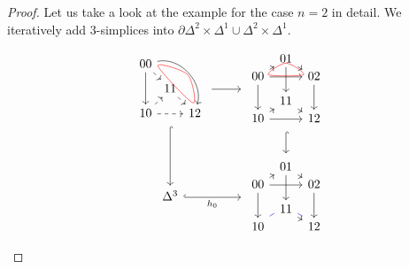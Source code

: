 \begin{proof}
        
    Let us take a look at the example for the case $n=2$ in detail.
    We iteratively add 3-simplices into $\partial \Delta^2 \times \Delta^1 \cup \Delta^2 \times \Delta^1$.
    \[
    \begin{tikzcd}
        \begin{tikzpicture}
            \node (A) at (-0.7,0.7) {$00$};
            \node (B) at (-0.7,-0.7) {$10$};
            \node (C) at (0.7,-0.7) {$12$};
            \node (D) at (0,0) {$11$};
            \draw [-> ] (A) -- (B);
            \draw[->] (A) to [bend left=60] (C);
            \draw [->, dashed] (A) -- (D);
            \draw [->, dashed] (B) -- (C);
            \draw [->, dashed] (B) -- (D);
            \draw [->, dashed] (D) -- (C);
            \draw [red] [smooth cycle] plot coordinates { (-0.35,0.75) (0.65,-0.3) (0.5,0.5)};
        \end{tikzpicture}
    \ar[r]
    \ar[d, hook]
    &
        \begin{tikzpicture}
            \node (A) at (0, 0.85) {$01$};
            \node (B) at (-0.8, 0.35) {$00$};
            \node (C) at (0.8, 0.35) {$02$};
            \node (D) at (0, -0.35) {$11$};
            \node (E) at (-0.8, -0.85) {$10$};
            \node (F) at (0.8, -0.85) {$12$};
            \draw[->] (A) to (C);
            \draw[->] (A) to (D);
            \draw[->] (B) to (C);
            \draw[->] (B) to (A);
            \draw[->] (B) to (E);
            \draw[->] (C) to (F);
            \draw[->] (D) to (F);
            \draw[->] (E) to (F);
            \draw[->] (E) to (D);
            \draw [red] [smooth cycle] plot coordinates { (0,0.83) (0.5,0.5) (-0.5,0.5)};
        \end{tikzpicture}
    \ar[d, hook]
    \\
    \Delta^3
    \ar[r, hook, "h_0"']
    &
        \begin{tikzpicture}
            \node (A) at (0, 0.85) {$01$};
            \node (B) at (-0.8, 0.35) {$00$};
            \node (C) at (0.8, 0.35) {$02$};
            \node (D) at (0, -0.35) {$11$};
            \node (E) at (-0.8, -0.85) {$10$};
            \node (F) at (0.8, -0.85) {$12$};
            \draw[->] (A) to (C);
            \draw[->] (A) to (D);
            \draw[->] (B) to (C);
            \draw[->] (B) to (A);
            \draw[->] (B) to (E);
            \draw[->] (C) to (F);
            \draw[->] (D) to (F);
            \begin{scope}[transform canvas={yshift=.3em}]
            	\draw[-] [draw = blue] (D) to (F);
            	\draw[-] [draw = blue] (E) to (D);

\end{scope}
\end{tikzpicture}
\end{tikzcd}\]
\end{proof}
